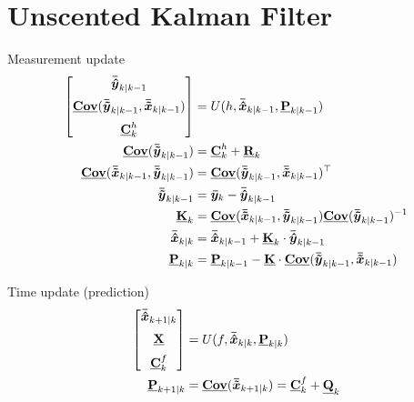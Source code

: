 \section{Unscented Kalman Filter} %
\label{sec:unscented_kalman_filter}
Measurement update 
\begin{equation}
        \begin{split}
                \begin{bmatrix}
                \bm{\bar{\hat{y}}}_{k \vert k-1} \\[2mm]
                \mathbf{\underline{{Cov}}}(\bm{\bar{\tilde{y}}}_{k \vert k-1}, \bm{\bar{\tilde{x}}}_{k \vert k-1}) \\[2mm]
                \mathbf{\underline{{C}}}_{k}^{h}
                \end{bmatrix} &= U(h, \bm{\bar{\hat{x}}}_{k \vert k-1}, \mathbf{\underline{{P}}}_{k \vert k -1}) \\
                \mathbf{\underline{{Cov}}}(\bm{\bar{\tilde{y}}}_{k \vert k-1}) &= \mathbf{\underline{{C}}}_{k}^{h} + \mathbf{\underline{{R}}}_k \\
                \mathbf{\underline{{Cov}}}(\bm{\bar{\tilde{x}}}_{k \vert k-1},\bm{\bar{\tilde{y}}}_{k \vert k-1}) &= \mathbf{\underline{{Cov}}}(\bm{\bar{\tilde{y}}}_{k \vert k-1},\bm{\bar{\tilde{x}}}_{k \vert k-1})^\top \\
                \bm{\bar{\tilde{y}}}_{k \vert k-1} &= \bm{\bar{y}}_k - \bm{\bar{\hat{y}}}_{k \vert k-1} \\
                \mathbf{\underline{{K}}}_k &= \mathbf{\underline{{Cov}}}(\bm{\bar{\tilde{x}}}_{k \vert k-1},\bm{\bar{\tilde{y}}}_{k \vert k-1})\mathbf{\underline{{Cov}}}(\bm{\bar{\tilde{y}}}_{k \vert k-1})^{-1} \\
                \bm{\bar{\hat{x}}}_{k \vert k} &= \bm{\bar{\hat{x}}}_{k \vert k-1} + \mathbf{\underline{{K}}}_k \cdot \bm{\bar{\hat{y}}}_{k \vert k-1} \\
                \mathbf{\underline{{P}}}_{k \vert k} &= \mathbf{\underline{{P}}}_{k \vert k-1} - \mathbf{\underline{{K}}} \cdot \mathbf{\underline{{Cov}}}(\bm{\bar{\tilde{y}}}_{k \vert k-1},\bm{\bar{\tilde{x}}}_{k \vert k-1})
        \end{split}
\end{equation}

Time update (prediction)
\begin{equation}
        \begin{split}
                \begin{bmatrix}
                \bm{\bar{\hat{x}}}_{k+1 \vert k} \\[2mm]
                \mathbf{\underline{{X}}} \\[2mm]
                \mathbf{\underline{{C}}}_{k}^{f}
                \end{bmatrix} &= U(f,\bm{\bar{\hat{x}}}_{k \vert k}, \mathbf{\underline{{P}}}_{k \vert k}) \\
                \mathbf{\underline{{P}}}_{k + 1 \vert k} &= \mathbf{\underline{{Cov}}}(\bm{\bar{\tilde{x}}}_{k+1 \vert k}) = \mathbf{\underline{{C}}}_{k}^{f} + \mathbf{\underline{{Q}}}_k
        \end{split}
\end{equation}

